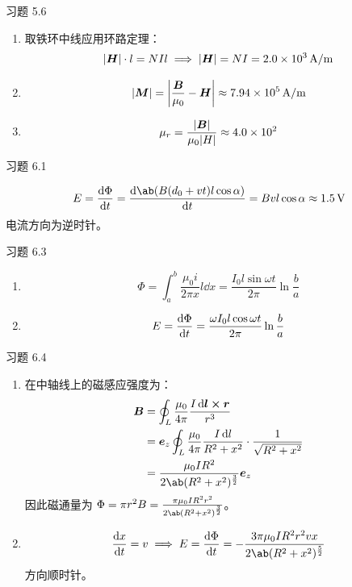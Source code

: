 \begin{problem}
	习题 5.6
	\begin{solution}
		\begin{enumerate}
			\item[\textbf{1)}] 取铁环中线应用环路定理：
			$$
			\abs{\boldsymbol{H}} \cdot l = N I l \implies \abs{\boldsymbol{H}} = N I = 2.0 \times 10^{3} \,\mathrm{A / m}
			$$
			\item[\textbf{2)}]
			$$
			\abs{\boldsymbol{M}} = \abs{\frac{\boldsymbol{B}}{\mu_0} - \boldsymbol{H}} \approx 7.94 \times 10^{5} \,\mathrm{A / m}
			$$
			\item[\textbf{3)}]
			$$
			\mu_r = \frac{\abs{\boldsymbol{B}}}{\mu_0 \abs{H}} \approx 4.0 \times 10^{2}
			$$
		\end{enumerate}
	\end{solution}
\end{problem}

\begin{problem}
	习题 6.1
	\begin{solution}
		$$
		E = \dv{\Phi}{t} = \dv{\ab(B (d_0 + v t) l \cos \alpha)}{t} = B v l \cos \alpha \approx 1.5 \,\mathrm{V}
		$$
		电流方向为逆时针。
	\end{solution}
\end{problem}

\begin{problem}
	习题 6.3
	\begin{solution}
		\begin{enumerate}
			\item[\textbf{1)}]
			$$
			\Phi = \int_{a}^{b} \frac{\mu_0 i}{2 \pi x} l \dd{x} = \frac{I_0 l \sin \omega t}{2 \pi} \ln \frac{b}{a}
			$$
			\item[\textbf{2)}]
			$$
			E = \dv{\Phi}{t} = \frac{\omega I_0 l \cos \omega t}{2 \pi} \ln \frac{b}{a}
			$$
		\end{enumerate}
	\end{solution}
\end{problem}

\begin{problem}
	习题 6.4
	\begin{solution}
		\begin{enumerate}
			\item[\textbf{1)}] 在中轴线上的磁感应强度为：
			$$
			\begin{aligned}
				\vect{B} & = \oint_L \frac{\mu_0}{4 \pi} \frac{I \dd{\vect{l}} \cp \vect{r}}{r^3} \\
				& = \vect{e}_z \oint_L \frac{\mu_0}{4\pi} \frac{I \dd{l}}{R^2 + x^2} \cdot \frac{1}{\sqrt{R^2 + x^2}} \\
				& = \frac{\mu_0 I R^2}{2 \ab(R^2 + x^2)^{\frac{3}{2}}} \vect{e}_z
			\end{aligned}
			$$
			因此磁通量为 $\Phi = \pi r^2 B = \frac{\pi \mu_0 I R^2 r^2}{2 \ab(R^2 + x^2)^{\frac{3}{2}}}$。

			\item[\textbf{2)}]
			$$
			\dv{x}{t} = v \implies E = \dv{\Phi}{t} = -\frac{3 \pi \mu_0 I R^2 r^2 v x}{2 \ab(R^2 + x^2)^{\frac{5}{2}}}
			$$
			方向顺时针。
		\end{enumerate}
	\end{solution}
\end{problem}

